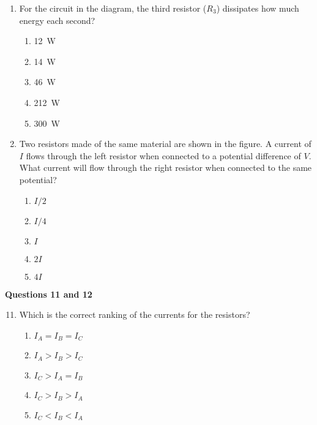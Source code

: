 \documentclass{../../oss-apphys}
\begin{document}
\begin{multicols}{2}
\begin{enumerate}[leftmargin=18pt]
  \item For the circuit in the diagram, the third resistor ($R_3$) dissipates
    how much energy each second?
    \begin{enumerate}[noitemsep,topsep=0pt,leftmargin=18pt,label=(\Alph*)]
    \item\SI{12}{W}
    \item\SI{14}{W}
    \item\SI{46}{W}
    \item\SI{212}{W}
    \item\SI{300}{W}
    \end{enumerate}

    \columnbreak
    
  \item Two resistors made of the same material are shown in the figure. A
    current of $I$ flows through the left resistor when connected to a
    potential difference of $V$. What current will flow through the right
    resistor when connected to the same potential?

    \vspace{-.2in}
    \begin{center}
    \end{center}
    \begin{enumerate}[noitemsep,topsep=0pt,leftmargin=18pt,label=(\Alph*)]
    \item $I/2$
    \item $I/4$
    \item $I$
    \item $2I$
    \item $4I$
    \end{enumerate}
  \end{enumerate}

  \textbf{Questions 11 and 12}
  
  \begin{center}
  \end{center}
  
  \begin{enumerate}[leftmargin=18pt]
    \setcounter{enumi}{10}
  \item Which is the correct ranking of the currents for the resistors?
    \begin{enumerate}[noitemsep,topsep=0pt,leftmargin=18pt,label=(\Alph*)]
    \item$I_A = I_B = I_C$
    \item$I_A > I_B > I_C$
    \item$I_C > I_A = I_B$
    \item$I_C > I_B > I_A$
    \item$I_C < I_B < I_A$
    \end{enumerate}


\end{enumerate}
\end{multicols}
\end{document}
